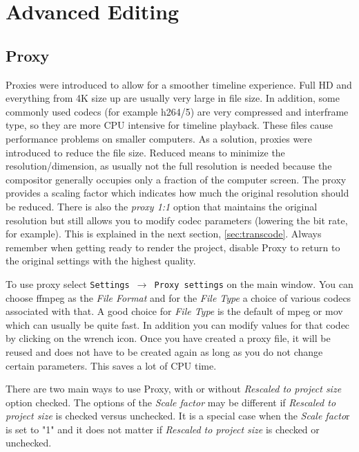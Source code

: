 \chapter{Advanced Editing}%
\label{cha:advanced_editing}

\section{Proxy}%
\label{sec:proxy}

Proxies were introduced to allow for a smoother timeline experience. Full HD and everything from 4K size up are usually very large in file size. In addition, some commonly used codecs (for example h264/5) are very compressed and interframe type, so they are more CPU intensive for timeline playback. These files cause performance problems on smaller computers. As a solution, proxies were introduced to reduce the file size. Reduced means to minimize the resolution/dimension, as usually not the full resolution is needed because the compositor generally occupies only a fraction of the computer screen. The proxy provides a scaling factor which indicates how much the original resolution should be reduced. 
There is also the \textit{proxy 1:1}  option that maintains the original resolution but still allows you to modify codec parameters (lowering the bit rate, for example). This is explained in the next section, \ref{sec:transcode}.
Always remember when getting ready to render the project, disable Proxy to return to the original settings with the highest quality.  

To use proxy select \texttt{Settings $\rightarrow$ Proxy settings} on the main window.  You can choose ffmpeg as the \textit{File Format}  and for the \textit{File Type} a choice of various codecs associated with that.  A good choice for \textit{File Type} is the default of mpeg or mov which can usually be quite fast.  In addition you can modify values for that codec by clicking on the wrench icon. Once you have created a
proxy file, it will be reused and does not have to be created again as long as you
do not change certain parameters.  This saves a lot of CPU time.

There are two main ways to use Proxy, with or without \textit{Rescaled to project size} option checked. The options of the \textit{Scale factor} may be different if \textit{Rescaled to project size} is checked versus unchecked. It is a special case when the \textit{Scale facto}r is set to "1" and it does not  matter if \textit{Rescaled to project size} is checked or unchecked.

